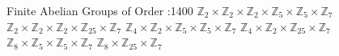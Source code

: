 \documentclass[12pt,letterpaper,boxed]{maths_v5}
\begin{document}
\begin{center}
Finite Abelian Groups of Order :1400\newline 
$\mathbb{Z}_{2}\times \mathbb{Z}_{2}\times \mathbb{Z}_{2}\times \mathbb{Z}_{5}\times \mathbb{Z}_{5}\times \mathbb{Z}_{7}$ \newline
$\mathbb{Z}_{2}\times \mathbb{Z}_{2}\times \mathbb{Z}_{2}\times \mathbb{Z}_{25}\times \mathbb{Z}_{7}$ \newline
$\mathbb{Z}_{4}\times \mathbb{Z}_{2}\times \mathbb{Z}_{5}\times \mathbb{Z}_{5}\times \mathbb{Z}_{7}$ \newline
$\mathbb{Z}_{4}\times \mathbb{Z}_{2}\times \mathbb{Z}_{25}\times \mathbb{Z}_{7}$ \newline
$\mathbb{Z}_{8}\times \mathbb{Z}_{5}\times \mathbb{Z}_{5}\times \mathbb{Z}_{7}$ \newline
$\mathbb{Z}_{8}\times \mathbb{Z}_{25}\times \mathbb{Z}_{7}$ \newline
\end{center}
\end{document}
